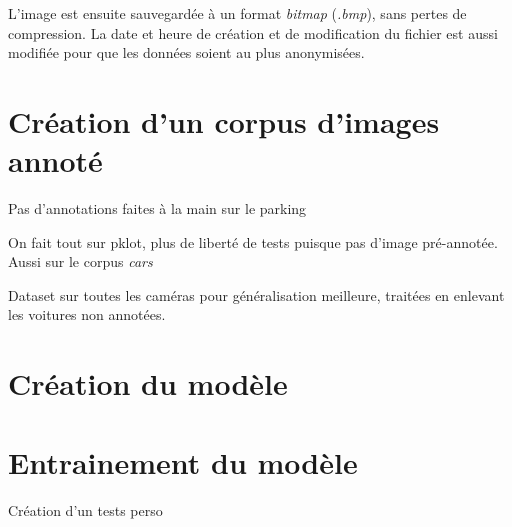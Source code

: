 L'image est ensuite sauvegardée à un format \textit{bitmap} (\textit{.bmp}), sans pertes de compression. La date et heure de création et de modification du fichier est aussi modifiée pour que les données soient au plus anonymisées.

\section{Création d'un corpus d'images annoté}

Pas d'annotations faites à la main sur le parking

On fait tout sur pklot, plus de liberté de tests puisque pas d'image pré-annotée.
Aussi sur le corpus \textit{cars}

Dataset sur toutes les caméras pour généralisation meilleure, traitées en enlevant les voitures non annotées.


\section{Création du modèle}

\section{Entrainement du modèle}




Création d'un tests perso






